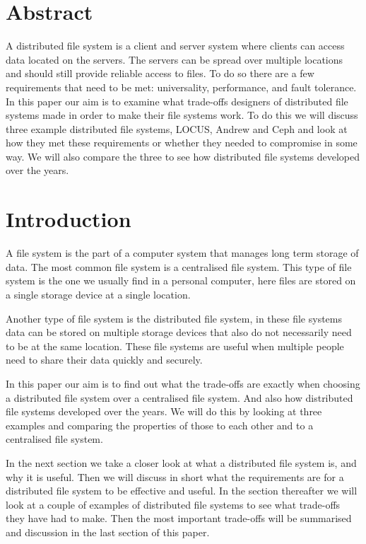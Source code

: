 \documentclass[a4paper,12px]{article}
\begin{document}
\clearpage
\vspace*{0.5cm}
\tableofcontents
\clearpage




\section{Abstract}

A distributed file system is a client and server system where clients can access
data located on the servers. The servers can be spread over multiple locations
and should still provide reliable access to files. To do so there are a few
requirements that need to be met: universality, performance, and fault
tolerance.  In this paper our aim is to examine what trade-offs designers of
distributed file systems made in order to make their file systems work. To do
this we will discuss three example distributed file systems, LOCUS, Andrew and
Ceph and look at how they met these requirements or whether they needed to
compromise in some way. We will also compare the three to see how distributed
file systems developed over the years.

\section{Introduction}

A file system is the part of a computer system that manages long term storage of
data.  The most common file system is a centralised file system. This type of
file system is the one we usually find in a personal computer, here files are
stored on a single storage device at a single location.

Another type of file system is the distributed file system, in these file
systems data can be stored on multiple storage devices that also do not
necessarily need to be at the same location. These file systems are useful when
multiple people need to share their data quickly and securely.

In this paper our aim is to find out what the trade-offs are exactly  when
choosing a distributed file system over a centralised file system. And also how
distributed file systems developed over the years. We will do this by looking at
three examples and comparing the properties of those to each other and to a
centralised file system.

In the next section we take a closer look at what a distributed file system is,
and why it is useful. Then we will discuss in short what the requirements are
for a distributed file system to be effective and useful. In the section
thereafter we will look at a couple of examples of distributed file systems to
see what trade-offs they have had to make. Then the most important trade-offs
will be summarised and discussion in the last section of this paper.
\end{document}
